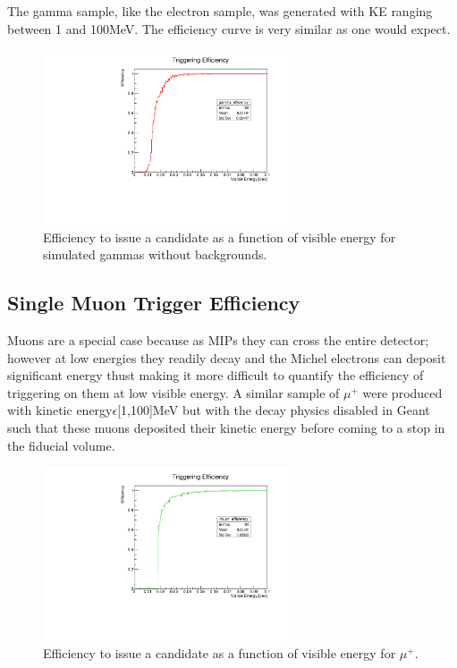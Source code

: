 \documentclass[10pt]{article}
\begin{document}
The gamma sample, like the electron sample, was generated with KE ranging between 1 and 100MeV. The efficiency curve is very similar as one would expect. 

\begin{figure}[H]
    \centering
    \includegraphics[angle=270,width=0.65\textwidth]{UpdatedEff/SingleParticle/gamma_efficiency_2.pdf}
    \caption{Efficiency to issue a candidate as a function of visible energy for simulated gammas without backgrounds.}
    \label{fig:eff_gamma}
\end{figure}

\subsection{Single Muon Trigger Efficiency}

Muons are a special case because as MIPs they can cross the entire detector; however at low energies they readily decay and the Michel electrons can deposit significant energy thust making it more difficult to quantify the efficiency of triggering on them at low visible energy. A similar sample of $\mu^+$ were produced with kinetic energy$\epsilon$[1,100]MeV but with the decay physics disabled in Geant such that these muons deposited their kinetic energy before coming to a stop in the fiducial volume. 

\begin{figure}[H]
    \centering
    \includegraphics[angle=270,width=0.65\textwidth]{UpdatedEff/SingleParticle/muplus_efficiency_2.pdf}
    \caption{Efficiency to issue a candidate as a function of visible energy for $\mu^+$.}
    \label{fig:eff_muplus}
\end{figure}
\end{document}
